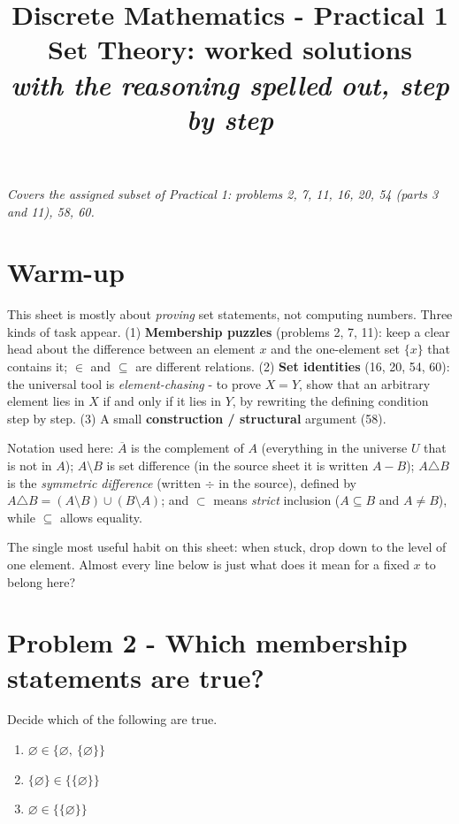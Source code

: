 \documentclass[11pt,a4paper]{article}
\title{\vspace{-1.2cm}\textbf{Discrete Mathematics - Practical 1}\\[2pt]
\large Set Theory: worked solutions\\[2pt]
\normalsize\itshape with the reasoning spelled out, step by step}
\author{}
\date{}
\newcommand{\symd}{\triangle}          %
\begin{document}
\maketitle
\vspace{-1.0cm}

\begin{center}\small\itshape Covers the assigned subset of Practical 1: problems 2, 7, 11, 16, 20, 54 (parts 3 and 11), 58, 60.\end{center}

\section*{Warm-up}

This sheet is mostly about \emph{proving} set statements, not computing numbers. Three kinds of
task appear. (1) \textbf{Membership puzzles} (problems 2, 7, 11): keep a clear head about the
difference between an element $x$ and the one-element set $\{x\}$ that contains it; $\in$ and
$\subseteq$ are different relations. (2) \textbf{Set identities} (16, 20, 54, 60): the universal
tool is \emph{element-chasing} - to prove $X=Y$, show that an arbitrary element lies in $X$ if and
only if it lies in $Y$, by rewriting the defining condition step by step. (3) A small
\textbf{construction / structural} argument (58).

Notation used here: $\overline{A}$ is the complement of $A$ (everything in the universe $U$ that
is not in $A$); $A\setminus B$ is set difference (in the source sheet it is written $A-B$);
$A\symd B$ is the \emph{symmetric difference} (written $\div$ in the source), defined by
$A\symd B=(A\setminus B)\cup(B\setminus A)$; and $\subset$ means \emph{strict} inclusion
($A\subseteq B$ and $A\neq B$), while $\subseteq$ allows equality.

The single most useful habit on this sheet: when stuck, drop down to the level of one element.
Almost every line below is just \textquotedbl{}what does it mean for a fixed $x$ to belong here?\textquotedbl{}

\section*{Problem 2 - Which membership statements are true?}

\begin{problembox}[2]
Decide which of the following are true.
\begin{enumerate}[label=\textbf{2.\arabic*},leftmargin=2.2cm]
\item $\varnothing \in \{\varnothing,\ \{\varnothing\}\}$
\item $\{\varnothing\} \in \{\{\varnothing\}\}$
\item $\varnothing \in \{\{\varnothing\}\}$
\end{enumerate}
\end{problembox}
\end{document}
